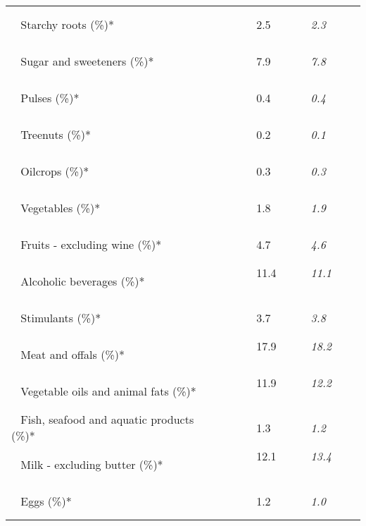 \begin{tabular}{L{3.9cm} R{1cm} R{1cm} R{1cm}}
	 ~ Starchy roots (\%)* &  ~ \ \ & 2.5 ~ \ \ & \textit{2.3} ~ \ \ \\ 
	 ~ Sugar and sweeteners (\%)* &  ~ \ \ & 7.9 ~ \ \ & \textit{7.8} ~ \ \ \\ 
	 ~ Pulses (\%)* &  ~ \ \ & 0.4 ~ \ \ & \textit{0.4} ~ \ \ \\ 
	 ~ Treenuts (\%)* &  ~ \ \ & 0.2 ~ \ \ & \textit{0.1} ~ \ \ \\ 
	 ~ Oilcrops (\%)* &  ~ \ \ & 0.3 ~ \ \ & \textit{0.3} ~ \ \ \\ 
	 ~ Vegetables (\%)* &  ~ \ \ & 1.8 ~ \ \ & \textit{1.9} ~ \ \ \\ 
	 ~ Fruits - excluding wine (\%)* &  ~ \ \ & 4.7 ~ \ \ & \textit{4.6} ~ \ \ \\ 
	 ~ Alcoholic beverages (\%)* &  ~ \ \ & 11.4 ~ \ \ & \textit{11.1} ~ \ \ \\ 
	 ~ Stimulants (\%)* &  ~ \ \ & 3.7 ~ \ \ & \textit{3.8} ~ \ \ \\ 
	 ~ Meat and offals (\%)* &  ~ \ \ & 17.9 ~ \ \ & \textit{18.2} ~ \ \ \\ 
	 ~ Vegetable oils and animal fats (\%)* &  ~ \ \ & 11.9 ~ \ \ & \textit{12.2} ~ \ \ \\ 
	 ~ Fish, seafood and aquatic products (\%)* &  ~ \ \ & 1.3 ~ \ \ & \textit{1.2} ~ \ \ \\ 
	 ~ Milk - excluding butter (\%)* &  ~ \ \ & 12.1 ~ \ \ & \textit{13.4} ~ \ \ \\ 
	 ~ Eggs (\%)* &  ~ \ \ & 1.2 ~ \ \ & \textit{1.0} ~ \ \ \\ 
       \toprule
      \end{tabular}
      \clearpage
{}
